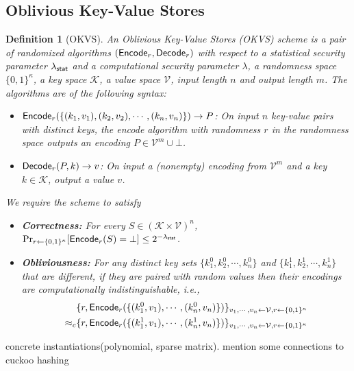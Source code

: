 \documentclass[sigconf]{acmart}
\newcommand{\Encode}{{\sf Encode}}
\newcommand{\Decode}{{\sf Decode}}
\newtheorem{definition}[theorem]{Definition}
\begin{document}
\subsection{Oblivious Key-Value Stores}
\begin{definition}[OKVS\cite{cryptoeprint:2021/883,cryptoeprint:2022/320}]
  An Oblivious Key-Value Stores (OKVS) scheme is a pair of randomized algorithms $(\Encode_r,\Decode_r)$ with respect to a statistical security parameter $\lambda_{\sf stat}$ and a computational security parameter $\lambda$, a randomness space $\{0,1\}^\kappa$, a key space $\mathcal{K}$, a value space $\mathcal{V}$, input length $n$ and output length $m$. The algorithms are of the following syntax: 
  \begin{itemize}
    \item $\Encode_r(\{(k_1,v_1),(k_2,v_2),\cdots,(k_n,v_n)\})\rightarrow P$: On input $n$ key-value pairs with distinct keys, the encode algorithm with randomness $r$ in the randomness space outputs an encoding $P\in\mathcal{V}^m\cup\bot$.
    \item $\Decode_r(P,k)\rightarrow v$: On input a (nonempty) encoding from $\mathcal{V}^m$ and a key $k\in\mathcal{K}$, output a value $v$. 
  \end{itemize}
  We require the scheme to satisfy
  \begin{itemize}
    \item \textbf{Correctness: }For every $S\in(\mathcal{K}\times\mathcal{V})^n$, $\Pr_{r\leftarrow\{0,1\}^\kappa}[\Encode_r(S)=\bot]\le 2^{-\lambda_{\sf stat}}$. 
    \item \textbf{Obliviousness: }For any distinct key sets $\{k_1^0,k_2^0,\cdots,k_n^0\}$ and $\{k_1^1,k_2^1,\cdots,k_n^1\}$ that are different, if they are paired with random values then their encodings are computationally indistinguishable, i.e., 
  \begin{align*}
    &\{r, \Encode_r(\{(k_1^0,v_1),\cdots,(k_n^0,v_n)\})\}_{v_1,\cdots,v_n\leftarrow \mathcal{V},r\leftarrow\{0,1\}^\kappa}\\
    \approx_c &\{r, \Encode_r(\{(k_1^1,v_1),\cdots,(k_n^1,v_n)\})\}_{v_1,\cdots,v_n\leftarrow \mathcal{V},r\leftarrow\{0,1\}^\kappa}
  \end{align*}
    
  \end{itemize}
\end{definition}
concrete instantiations(polynomial, sparse matrix). mention some connections to cuckoo hashing
\end{document}
